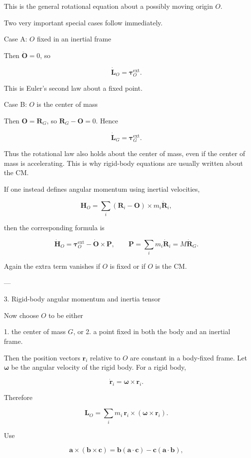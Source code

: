 \documentclass[a4paper,11pt]{article}
\begin{document}
This is the general rotational equation about a possibly moving origin \(O\).

Two very important special cases follow immediately.

Case A: \(O\) fixed in an inertial frame

Then \(\ddot{\mathbf O}=0\), so

\[
\boxed{
\dot{\mathbf L}_O=\boldsymbol\tau_O^{\mathrm{ext}}.
}
\]

This is Euler’s second law about a fixed point.

Case B: \(O\) is the center of mass

Then \(\mathbf O=\mathbf R_G\), so \(\mathbf R_G-\mathbf O=0\). Hence

\[
\boxed{
\dot{\mathbf L}_G=\boldsymbol\tau_G^{\mathrm{ext}}.
}
\]

Thus the rotational law also holds about the center of mass, even if the center of mass is accelerating. This is why rigid-body equations are usually written about the CM.

If one instead defines angular momentum using inertial velocities,

\[
\mathbf H_O=\sum_i(\mathbf R_i-\mathbf O)\times m_i\dot{\mathbf R}_i,
\]

then the corresponding formula is

\[
\dot{\mathbf H}_O
=
\boldsymbol\tau_O^{\mathrm{ext}}
-
\dot{\mathbf O}\times\mathbf P,
\qquad
\mathbf P=\sum_i m_i\dot{\mathbf R}_i=M\dot{\mathbf R}_G.
\]

Again the extra term vanishes if \(O\) is fixed or if \(O\) is the CM.

---

3. Rigid-body angular momentum and inertia tensor

Now choose \(O\) to be either

1. the center of mass \(G\), or
2. a point fixed in both the body and an inertial frame.

Then the position vectors \(\mathbf r_i\) relative to \(O\) are constant in a body-fixed frame. Let \(\boldsymbol\omega\) be the angular velocity of the rigid body. For a rigid body,

\[
\dot{\mathbf r}_i=\boldsymbol\omega\times\mathbf r_i .
\]

Therefore

\[
\mathbf L_O
=
\sum_i m_i\,\mathbf r_i\times(\boldsymbol\omega\times\mathbf r_i).
\]

Use

\[
\mathbf a\times(\mathbf b\times\mathbf c)
=
\mathbf b(\mathbf a\cdot\mathbf c)
-
\mathbf c(\mathbf a\cdot\mathbf b),
\]
\end{document}
